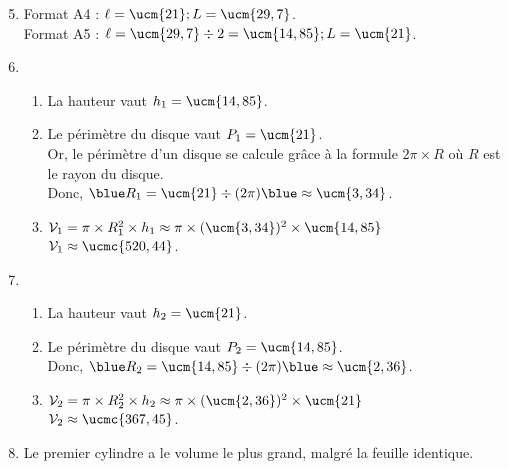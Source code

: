 \begin{corrige}
\begin{enumerate}
   \setcounter{enumi}{4}
      \item Format A4 : {\blue $\ell =\ucm{21}; L=\ucm{29,7}$}. \\
         Format A5 : {\blue $\ell =\ucm{29,7}\div2 = \ucm{14,85}; L=\ucm{21}$}.
      \item
      \begin{enumerate}
         \item La hauteur vaut {\blue $h_1 =\ucm{14,85}$}.
         \item Le périmètre du disque vaut {\blue $P_1 =\ucm{21}$}. \\
         Or, le périmètre d'un disque se calcule grâce à la formule $2\pi\times R$ où $R$ est le rayon du disque. \\
            Donc,  ${\blue R_1} =\ucm{21}\div(2\pi) {\blue \approx\ucm{3,34}}$.
         \item $\mathcal{V}_1 =\pi\times R_1^2\times h_1 \approx\pi\times(\ucm{3,34})^2\times\ucm{14,85}$ \\
            {\blue $\mathcal{V}_1 \approx\ucmc{520,44}$}.
      \end{enumerate}
      \setcounter{enumi}{6}
      \item
      \begin{enumerate}
         \item La hauteur vaut {\blue $h_2 =\ucm{21}$}.
         \item Le périmètre du disque vaut {\blue $P_2 =\ucm{14,85}$}. \\
            Donc,  ${\blue R_2} =\ucm{14,85}\div(2\pi) {\blue \approx\ucm{2,36}}$.
         \item $\mathcal{V}_2 =\pi\times R_2^2\times h_2 \approx\pi\times(\ucm{2,36})^2\times\ucm{21}$ \\
            {\blue $\mathcal{V}_2 \approx\ucmc{367,45}$}.
      \end{enumerate}
      \setcounter{enumi}{7}
      \item {\blue Le premier cylindre a le volume le plus grand}, malgré la feuille identique.
   \end{enumerate}
\end{corrige}
